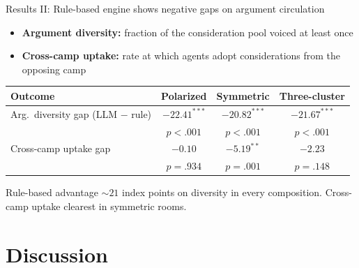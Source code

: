 \documentclass[aspectratio=169,11pt]{beamer}
\begin{document}
\begin{frame}{Results II: Rule-based engine shows negative gaps on argument circulation}

\begin{itemize}
    \item \textbf{Argument diversity:} fraction of the consideration pool voiced at least once
    \item \textbf{Cross-camp uptake:} rate at which agents adopt considerations from the opposing camp
\end{itemize}

\vspace{0.3cm}
\begin{table}
\centering
\small
\begin{tabular}{lccc}
\toprule
\textbf{Outcome} & \textbf{Polarized} & \textbf{Symmetric} & \textbf{Three-cluster} \\
\midrule
Arg.\ diversity gap (LLM $-$ rule) & $-22.41^{***}$ & $-20.82^{***}$ & $-21.67^{***}$ \\
 & {\scriptsize $p < .001$} & {\scriptsize $p < .001$} & {\scriptsize $p < .001$} \\[4pt]
Cross-camp uptake gap & $-0.10$ & $-5.19^{**}$ & $-2.23$ \\
 & {\scriptsize $p = .934$} & {\scriptsize $p = .001$} & {\scriptsize $p = .148$} \\
\bottomrule
\end{tabular}
\end{table}

\vspace{0.2cm}
{\small Rule-based advantage $\sim 21$ index points on diversity in every composition. Cross-camp uptake clearest in symmetric rooms.}

\end{frame}

\section{Discussion}
\end{document}
